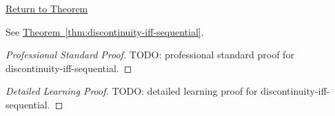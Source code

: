 \newpage
{}
\label{prf:discontinuity-iff-sequential}

\begin{remark*}[Return]
\hyperref[thm:discontinuity-iff-sequential]{Return to Theorem}
\end{remark*}

\begin{theorem*}
See \hyperref[thm:discontinuity-iff-sequential]{Theorem~\ref*{thm:discontinuity-iff-sequential}}.
\end{theorem*}

\begin{proof}[Professional Standard Proof]
\LRAProofBodyStart
TODO: professional standard proof for discontinuity-iff-sequential.
\end{proof}

\begin{proof}[Detailed Learning Proof]
\LRAProofBodyStart
TODO: detailed learning proof for discontinuity-iff-sequential.
\end{proof}

\begin{remark*}
\end{remark*}

\begin{dependencies}
\NoLocalDependencies
\end{dependencies}

\clearpage

